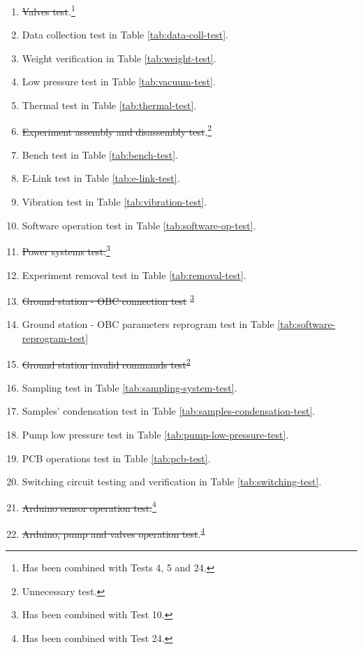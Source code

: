 \begin{enumerate}
    \item \st{Valves test}.\footnote{Has been combined with Tests 4, 5 and 24.\label{fn:test-combined}}
    \item Data collection test in Table \ref{tab:data-coll-test}.
    \item Weight verification in Table \ref{tab:weight-test}.
    \item Low pressure test in Table \ref{tab:vacuum-test}.
    \item Thermal test in Table \ref{tab:thermal-test}.
    \item \st{Experiment assembly and disassembly test}.\footnote{Unnecessary test.\label{fn:test-removed}}
    \item Bench test in Table \ref{tab:bench-test}.
    \item E-Link test in Table \ref{tab:e-link-test}.
    \item Vibration test in Table \ref{tab:vibration-test}.
    \item Software operation test in Table \ref{tab:software-op-test}.
    \item \st{Power systems test.}\footnote{Has been combined with Test 10.\label{fn:test-combined10}}
    \item Experiment removal test in Table \ref{tab:removal-test}.
    \item \st{Ground station - OBC connection test} \textsuperscript{\ref{fn:test-combined10}}
    \item Ground station - OBC parameters reprogram test in Table \ref{tab:software-reprogram-test}
    \item \st{Ground station invalid commands test}\textsuperscript{\ref{fn:test-removed}}
    \item Sampling test in Table \ref{tab:sampling-system-test}.
    \item Samples' condensation test in Table \ref{tab:samples-condensation-test}.
    \item Pump low pressure test in Table \ref{tab:pump-low-pressure-test}.
    \item PCB operations test in Table \ref{tab:pcb-test}.
    \item Switching circuit testing and verification in Table \ref{tab:switching-test}.
    \item \st{Arduino sensor operation test.}\footnote{Has been combined with Test 24.\label{fn:test-combined24}}
    \item \st{Arduino, pump and valves operation test}.\textsuperscript{\ref{fn:test-combined24}}

\end{enumerate}
